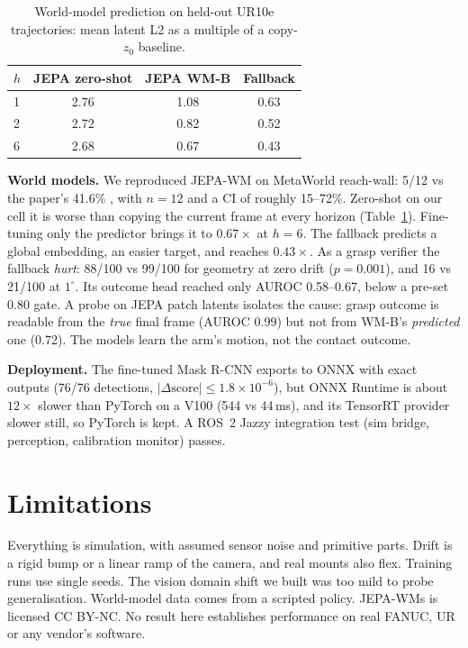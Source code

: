 \documentclass[10pt,twocolumn]{article}
\begin{document}
\begin{table}[t]\centering\small
\caption{World-model prediction on held-out UR10e trajectories: mean latent L2 as a multiple of a copy-$z_0$ baseline.}
\begin{tabular}{lccc}\toprule
$h$ & JEPA zero-shot & JEPA WM-B & Fallback\\\midrule
1 & 2.76 & 1.08 & 0.63\\
2 & 2.72 & 0.82 & 0.52\\
6 & 2.68 & 0.67 & 0.43\\\bottomrule
\end{tabular}\label{tab:wm}\end{table}

\textbf{World models.} We reproduced JEPA-WM on MetaWorld reach-wall: 5/12 vs the paper's 41.6\%
\citep{terver2025jepawms}, with $n=12$ and a CI of roughly 15--72\%. Zero-shot on our cell it is worse than copying the
current frame at every horizon (Table~\ref{tab:wm}). Fine-tuning only the predictor brings it to $0.67\times$ at $h=6$.
The fallback predicts a global embedding, an easier target, and reaches $0.43\times$. As a grasp verifier the fallback
\emph{hurt}: 88/100 vs 99/100 for geometry at zero drift ($p=0.001$), and 16 vs 21/100 at $1^\circ$. Its outcome head
reached only AUROC 0.58--0.67, below a pre-set 0.80 gate. A probe on JEPA patch latents isolates the cause: grasp
outcome is readable from the \emph{true} final frame (AUROC 0.99) but not from WM-B's \emph{predicted} one (0.72).
The models learn the arm's motion, not the contact outcome.

\textbf{Deployment.} The fine-tuned Mask R-CNN exports to ONNX with exact outputs (76/76 detections,
$|\Delta\text{score}|\le1.8\times10^{-6}$), but ONNX Runtime is about $12\times$ slower than PyTorch on a V100 (544 vs
44\,ms), and its TensorRT provider slower still, so PyTorch is kept. A ROS~2 Jazzy integration test (sim bridge,
perception, calibration monitor) passes.

\section{Limitations}
Everything is simulation, with assumed sensor noise and primitive parts. Drift is a rigid bump or a linear ramp of the
camera, and real mounts also flex. Training runs use single seeds. The vision domain shift we built was too mild to
probe generalisation. World-model data comes from a scripted policy. JEPA-WMs is licensed CC BY-NC. No result here
establishes performance on real FANUC, UR or any vendor's software.
\end{document}

